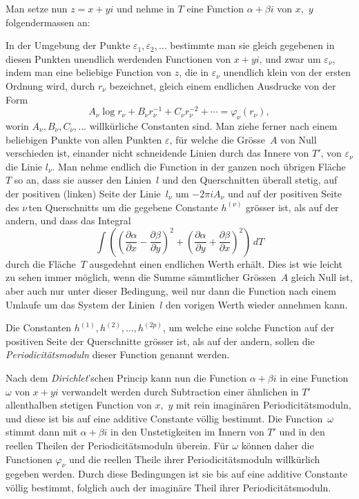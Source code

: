 \documentclass[a4paper,12pt,leqno]{article}
\begin{document}
Man setze nun $z = x + yi$ und nehme in $T$ eine Function
$\alpha + \beta i$ von $x$,~$y$ folgendermassen an:

In der Umgebung der Punkte $\varepsilon_1, \varepsilon_2,\ldots$
bestimmte man sie gleich gegebenen in diesen Punkten unendlich
werdenden Functionen von $x + yi$, und zwar um $\varepsilon_\nu$,
indem man eine beliebige Function von $z$, die in
$\varepsilon_\nu$ unendlich klein von der ersten Ordnung wird,
durch $r_\nu$ bezeichnet, gleich einem endlichen Ausdrucke von
der Form
\[ A_\nu \log r_\nu + B_\nu r_\nu^{-1} + C_\nu r_\nu^{-2} + \cdots
   = \varphi_\nu(r_\nu),\]
worin $A_\nu, B_\nu, C_\nu,\ldots$ willk\"{u}rliche Constanten
sind.  Man ziehe ferner nach einem beliebigen Punkte von allen
Punkten $\varepsilon$, f\"{u}r welche die Gr\"{o}sse~$A$ von Null
verschieden ist, einander nicht schneidende Linien durch das
Innere von $T'$, von $\varepsilon_\nu$ die Linie $l_\nu$.  Man
nehme endlich die Function in der ganzen noch \"{u}brigen
Fl\"{a}che~$T$ so an, dass sie ausser den Linien~$l$ und den
Querschnitten \"{u}berall stetig, auf der positiven (linken)
Seite der Linie~$l_\nu$ um $-2\pi i A_\nu$ und auf der positiven
Seite des $\nu \,$\-ten Querschnitts um die gegebene Constante
$h^{(\nu)}$ gr\"{o}sser ist, als auf der andern, und dass das
Integral
\[ \int  \left(
            \left(
               \frac{\partial \alpha}{\partial x}
             - \frac{\partial \beta}{\partial y}
            \right)^2
          + \left(
               \frac{\partial \alpha}{\partial y}
             + \frac{\partial \beta}{\partial x}
            \right)^2
         \right) \, dT \]
durch die Fl\"{a}che~$T$ ausgedehnt einen endlichen Werth
erh\"{a}lt.  Dies ist wie leicht zu sehen immer m\"{o}glich, wenn
die Summe s\"{a}mmtlicher Gr\"{o}ssen~$A$ gleich Null ist, aber
auch nur unter dieser Bedingung, weil nur dann die Function nach
einem Umlaufe um das System der Linien~$l$ den vorigen Werth
wieder annehmen kann.

Die Constanten $h^{(1)}, h^{(2)},\ldots, h^{(2p)}$, um welche
eine solche Function auf der positiven Seite der Querschnitte
gr\"{o}sser ist, als auf der andern, sollen die
\emph{Periodicit\"{a}tsmoduln} dieser Function genannt werden.

Nach dem \emph{Dirichlet}'schen Princip kann nun die Function
$\alpha + \beta i$ in eine Function $\omega$ von $x + yi$
verwandelt werden durch Subtraction einer \"{a}hnlichen in $T'$
allenthalben stetigen Function von $x$,~$y$ mit rein
imagin\"{a}ren Periodicit\"{a}tsmoduln, und diese ist bis auf
eine additive Constante v\"{o}llig bestimmt.  Die
Function~$\omega$ stimmt dann mit $\alpha + \beta i$ in den
Unstetigkeiten im Innern von $T'$ und in den reellen Theilen der
Periodicit\"{a}tsmoduln \"{u}berein.  F\"{u}r $\omega$ k\"{o}nnen
daher die Functionen $\varphi_\nu$ und die reellen Theile ihrer
Periodicit\"{a}tsmoduln willk\"{u}rlich gegeben werden.  Durch
diese Bedingungen ist sie bis auf eine additive Constante
v\"{o}llig bestimmt, folglich auch der imagin\"{a}re Theil ihrer
Periodicit\"{a}tsmoduln.
\end{document}
